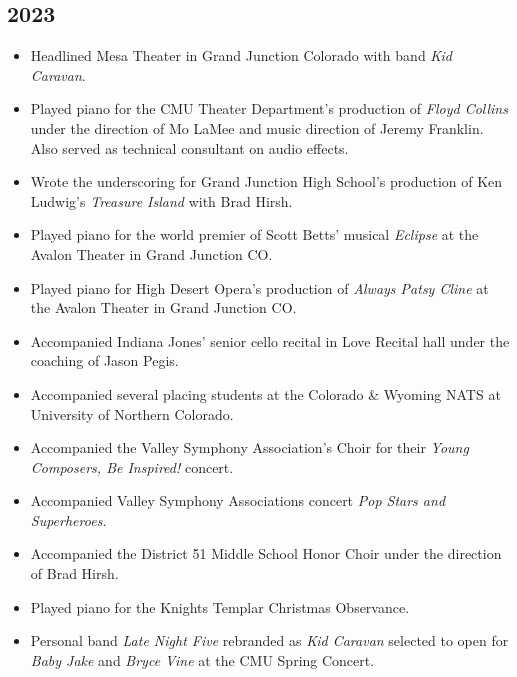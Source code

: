 \documentclass{article}
\newcommand{\cvItem}[1]{
        \item {
            {#1}
        }
    }
\newcommand{\cvItemListStart}{\begin{itemize}[leftmargin=10pt]}
\newcommand{\cvItemListEnd}{\end{itemize}}
\begin{document}
        \subsection{2023}
            \cvItemListStart
                \cvItem{Headlined Mesa Theater in Grand Junction Colorado with band {\em Kid
                Caravan}.}
                \cvItem{Played piano for the CMU Theater Department's production of {\em Floyd
                Collins} under the direction of Mo LaMee and music direction of Jeremy Franklin.
                Also served as technical consultant on audio effects.}
                \cvItem{Wrote the underscoring for Grand Junction High School's production of Ken
                Ludwig's {\em Treasure Island} with Brad Hirsh.}
                \cvItem{Played piano for the world premier of Scott Betts' musical {\em Eclipse} at
                the Avalon Theater in Grand Junction CO.}
                \cvItem{Played piano for High Desert Opera's production of {\em Always Patsy Cline}
                at the Avalon Theater in Grand Junction CO.}
                \cvItem{Accompanied Indiana Jones' senior cello recital in Love Recital hall under
                the coaching of Jason Pegis.}
                \cvItem{Accompanied several placing students at the Colorado \& Wyoming NATS at
                University of Northern Colorado.}
                \cvItem{Accompanied the Valley Symphony Association's Choir for their {\em Young
                Composers, Be Inspired!} concert.}
                \cvItem{Accompanied Valley Symphony Associations concert {\em Pop Stars and
                Superheroes.}}
                \cvItem{Accompanied the District 51 Middle School Honor Choir under the direction of
                Brad Hirsh.}
                \cvItem{Played piano for the Knights Templar Christmas Observance.}
                \cvItem{Personal band {\em Late Night Five} rebranded as {\em Kid Caravan} selected
                to open for {\em Baby Jake} and {\em Bryce Vine} at the CMU Spring Concert.}
            \cvItemListEnd
\end{document}
